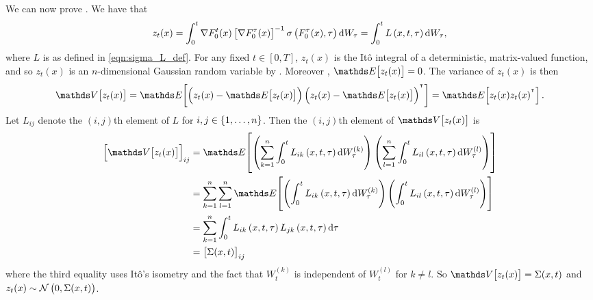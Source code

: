 We can now prove .
We have that
\[
	z_t(x) = \int_0^t{\nabla F_0^t(x)\left[\nabla F_0^\tau(x)\right]^{-1}\sigma\left(F_0^\tau(x), \tau\right)\dif W_\tau} = \int_0^t{L\left(x, t,\tau\right)\dif W_\tau},
\]
where \(L\) is as defined in \eqref{eqn:sigma_L_def}.
For any fixed \(t \in [0,T]\), \(z_t(x)\) is the It\^o integral of a deterministic, matrix-valued function, and so \(z_t(x)\) is an \(n\)-dimensional Gaussian random variable by .
Moreover \cite{KallianpurSundar_2014_StochasticAnalysisDiffusion}, \(\avg{z_t(x)} = 0\).
The variance of \(z_t(x)\) is then
\[
	\var{z_t(x)} = \avg{\left(z_t(x) - \avg{z_t(x)}\right)\left(z_t(x) - \avg{z_t(x)}\right)^{\T}} = \avg{z_t(x) z_t(x)^{\T}}.
\]
Let \(L_{ij}\) denote the \((i,j)\)th element of \(L\) for \(i,j \in \set{1,\hdots,n}\).
Then the \((i,j)\)th element of \(\var{z_t(x)}\) is
\begin{align*}
	\left[\var{z_t(x)}\right]_{ij} & = \avg{\left(\sum_{k=1}^n\int_0^t{L_{ik}\left(x, t, \tau\right)\dif W_{\tau}^{(k)}}\right)\left(\sum_{l=1}^n\int_0^t{L_{il}\left(x, t, \tau\right)\dif W_{\tau}^{(l)}}\right)}   \\
	                               & = \sum_{k=1}^{n}\sum_{l=1}^n\avg{\left(\int_0^t{L_{ik}\left(x, t, \tau\right)\dif W_{\tau}^{(k)}}\right)\left(\int_0^t{L_{il}\left(x, t, \tau\right)\dif W_{\tau}^{(l)}}\right)} \\
	                               & = \sum_{k=1}^n{\int_0^t{L_{ik}\left(x, t, \tau\right)L_{jk}\left(x, t, \tau\right)\dif\tau}}                                                                                     \\
	                               & = \left[\Sigma(x,t)\right]_{ij}
\end{align*}
where the third equality uses It\^o's isometry \cite{KallianpurSundar_2014_StochasticAnalysisDiffusion} and the fact that \(W_t^{(k)}\) is independent of \(W_t^{(l)}\) for \(k \neq l\). %
So \(\var{z_t(x)} = \Sigma(x,t)\) and \(z_t(x) \sim\mathcal{N}\left(0, \Sigma(x,t)\right)\).


